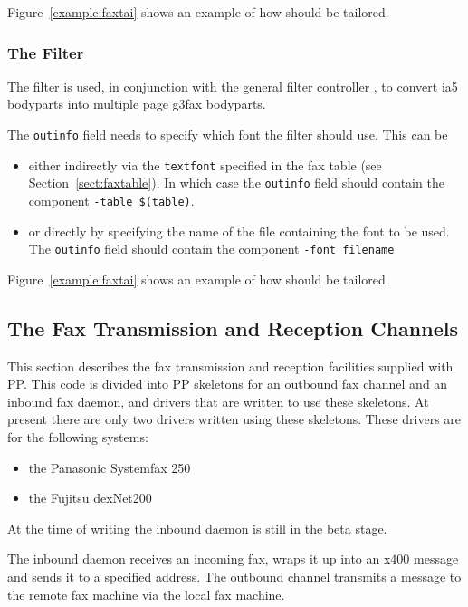Figure~\ref{example:faxtai} shows an example of how 
should be tailored.


\subsubsection {The  Filter}

The  filter is used, in conjunction with the general
filter controller , to convert ia5 bodyparts into
multiple page g3fax bodyparts.

The \verb+outinfo+ field needs to specify which font the filter should
use.
This can be 
\begin{itemize}
\item	either indirectly via the \verb+textfont+ specified in the fax table
(see Section~\ref{sect:faxtable}). In which case the \verb+outinfo+ field
should contain the component \verb+-table $(table)+.
\item	or directly by specifying the name of the file containing the
font to be used. The \verb+outinfo+ field should contain the component
\verb+-font filename+
\end{itemize}

Figure~\ref{example:faxtai} shows an example of how 
should be tailored.

\subsection	{The Fax Transmission and Reception Channels} 
	\label{sect:faxtrans}

This section describes the fax transmission and reception facilities
supplied with PP.
This code is divided into PP skeletons for an outbound fax channel and
an inbound fax daemon, and drivers that are written to use these
skeletons.
At present there are only two drivers written using these skeletons.
These drivers are for the following systems:
\begin{itemize}
\item	the Panasonic Systemfax 250 
\item	the Fujitsu dexNet200
\end{itemize}
At the time of writing the inbound daemon is still in the beta stage.

The inbound daemon receives an incoming fax, wraps it up into an x400
message and sends it to a specified address.
The outbound channel transmits a message to the remote fax machine via
the local fax machine.

